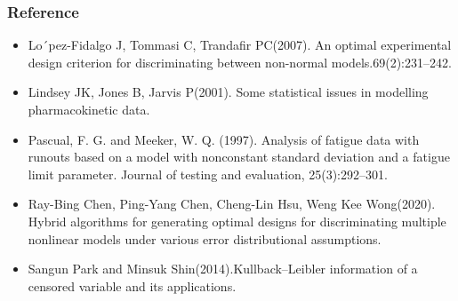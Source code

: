 \documentclass[xcolor=dvipsnames,aspectratio=1610]{beamer}
\begin{document}
\begin{frame}
\frametitle{Reference}
\begin{itemize}
\item Lo´pez-Fidalgo J, Tommasi C, Trandafir PC(2007). An optimal experimental design criterion for discriminating
between non-normal models.69(2):231–242.

\item Lindsey JK, Jones B, Jarvis P(2001). Some statistical issues in modelling pharmacokinetic data.

\item Pascual, F. G. and Meeker, W. Q. (1997). Analysis of fatigue data with runouts based on a model with nonconstant standard deviation and a fatigue limit parameter. Journal of testing and evaluation, 25(3):292–301.

\item Ray-Bing Chen, Ping-Yang Chen, Cheng-Lin Hsu, Weng Kee Wong(2020). Hybrid algorithms for generating optimal designs for discriminating multiple nonlinear models under various error distributional assumptions.

\item Sangun Park and Minsuk Shin(2014).Kullback–Leibler information of a censored variable and its applications.

\end{itemize}
\end{frame}
\end{document}
